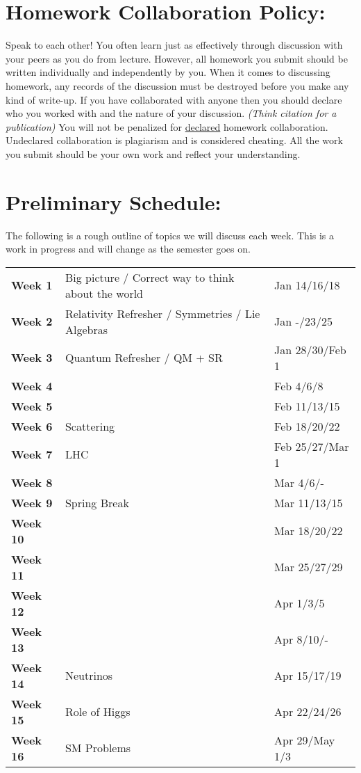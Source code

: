 \documentclass[margin,line]{res}
\begin{document}
\begin{resume}
\section{Homework Collaboration Policy:} 

Speak to each other!
You often learn just as effectively through discussion with your peers as you do from lecture. 
However, all homework you submit should be written individually and independently by you.
When it comes to discussing homework, any records of the discussion must be destroyed before you make any kind of write-up. 
If you have collaborated with anyone then you should declare who you worked with and the nature of your discussion. 
\textit{(Think citation for a publication)}
You will not be penalized for \underline{declared} homework collaboration. 
Undeclared collaboration is plagiarism and is considered cheating. 
All the work you submit should be your own work and reflect your understanding.


\section{Preliminary Schedule:}

The following is a rough outline of topics we will discuss each week. 
This is a work in progress and will change as the semester goes on.

\begin{tabular}{lll}
\textbf{Week 1}  & Big picture / Correct way to think about the world & Jan 14/16/18 \\
\textbf{Week 2}  & Relativity Refresher / Symmetries /  Lie Algebras & Jan -/23/25 \\
\textbf{Week 3}  & Quantum Refresher / QM + SR   & Jan 28/30/Feb 1 \\
\textbf{Week 4}  &  & Feb 4/6/8\\
\textbf{Week 5}  &  & Feb 11/13/15\\
\textbf{Week 6}  & Scattering  & Feb 18/20/22\\
\textbf{Week 7}  & LHC  & Feb 25/27/Mar 1\\
\textbf{Week 8}  &  & Mar 4/6/- \\
\textbf{Week 9}  & Spring Break & Mar 11/13/15\\
\textbf{Week 10} &  & Mar 18/20/22 \\
\textbf{Week 11} &  & Mar 25/27/29\\
\textbf{Week 12} &  & Apr 1/3/5\\
\textbf{Week 13} &  & Apr 8/10/-\\
\textbf{Week 14} & Neutrinos & Apr 15/17/19\\
\textbf{Week 15} & Role of Higgs & Apr 22/24/26\\
\textbf{Week 16} & SM Problems  & Apr 29/May 1/3\\
\end{tabular}

\end{resume}
\end{document}
